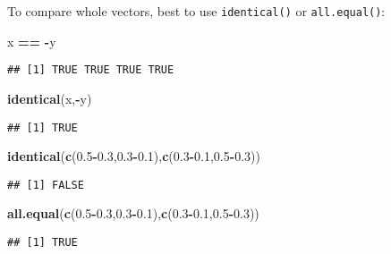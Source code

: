 \documentclass[8pt,ignorenonframetext,]{beamer}
\newenvironment{Shaded}{\begin{snugshade}}{\end{snugshade}}
\newcommand{\KeywordTok}[1]{\textcolor[rgb]{0.13,0.29,0.53}{\textbf{#1}}}
\newcommand{\FloatTok}[1]{\textcolor[rgb]{0.00,0.00,0.81}{#1}}
\newcommand{\StringTok}[1]{\textcolor[rgb]{0.31,0.60,0.02}{#1}}
\newcommand{\OperatorTok}[1]{\textcolor[rgb]{0.81,0.36,0.00}{\textbf{#1}}}
\newcommand{\NormalTok}[1]{#1}
\begin{document}
\begin{frame}[fragile]{}

To compare whole vectors, best to use \texttt{identical()} or
\texttt{all.equal()}:

\begin{Shaded}
\begin{Highlighting}[]
\NormalTok{x }\OperatorTok{==}\StringTok{ }\OperatorTok{-}\NormalTok{y}
\end{Highlighting}
\end{Shaded}

\begin{verbatim}
## [1] TRUE TRUE TRUE TRUE
\end{verbatim}

\begin{Shaded}
\begin{Highlighting}[]
\KeywordTok{identical}\NormalTok{(x,}\OperatorTok{-}\NormalTok{y)}
\end{Highlighting}
\end{Shaded}

\begin{verbatim}
## [1] TRUE
\end{verbatim}

\begin{Shaded}
\begin{Highlighting}[]
\KeywordTok{identical}\NormalTok{(}\KeywordTok{c}\NormalTok{(}\FloatTok{0.5}\OperatorTok{-}\FloatTok{0.3}\NormalTok{,}\FloatTok{0.3}\OperatorTok{-}\FloatTok{0.1}\NormalTok{),}\KeywordTok{c}\NormalTok{(}\FloatTok{0.3}\OperatorTok{-}\FloatTok{0.1}\NormalTok{,}\FloatTok{0.5}\OperatorTok{-}\FloatTok{0.3}\NormalTok{))}
\end{Highlighting}
\end{Shaded}

\begin{verbatim}
## [1] FALSE
\end{verbatim}

\begin{Shaded}
\begin{Highlighting}[]
\KeywordTok{all.equal}\NormalTok{(}\KeywordTok{c}\NormalTok{(}\FloatTok{0.5}\OperatorTok{-}\FloatTok{0.3}\NormalTok{,}\FloatTok{0.3}\OperatorTok{-}\FloatTok{0.1}\NormalTok{),}\KeywordTok{c}\NormalTok{(}\FloatTok{0.3}\OperatorTok{-}\FloatTok{0.1}\NormalTok{,}\FloatTok{0.5}\OperatorTok{-}\FloatTok{0.3}\NormalTok{))}
\end{Highlighting}
\end{Shaded}

\begin{verbatim}
## [1] TRUE
\end{verbatim}

\end{frame}
\end{document}
